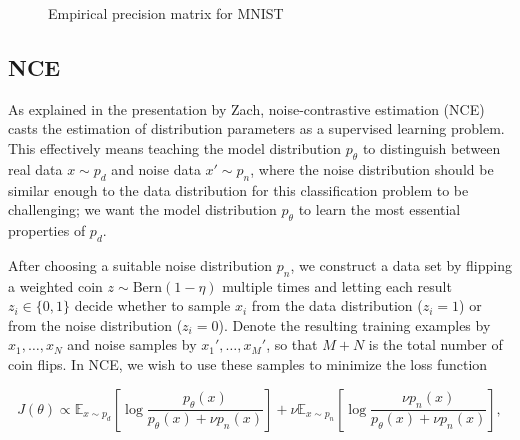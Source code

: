 \documentclass[a4paper]{article}
\theoremstyle{definition}
\theoremstyle{plain}
\begin{document}
\begin{figure}[H]
	\centering
	\begin{subfigure}[b]{0.49\textwidth}
		
		\caption{}
	\end{subfigure}
	\hfill
	\begin{subfigure}[b]{0.49\textwidth}
		
		\caption{}
	\end{subfigure}
	\caption{Empirical precision matrix for MNIST}
\end{figure}


\subsection*{NCE}

As explained in the presentation by Zach, noise-contrastive estimation (NCE) casts the estimation of distribution parameters as a supervised learning problem. This effectively means teaching the model distribution $p_\theta$ to distinguish between real data $x \sim p_d$ and noise data $x' \sim p_n$, where the noise distribution should be similar enough to the data distribution for this classification problem to be challenging; we want the model distribution $p_\theta$ to learn  the most essential properties of $p_d$.

After choosing a suitable noise distribution $p_n$, we construct a data set by flipping a weighted coin $z \sim \text{Bern}(1-\eta)$ multiple times and letting each result $z_i \in \{0,1\}$ decide whether to sample $x_i$ from the data distribution ($z_i = 1$) or from the noise distribution ($z_i = 0$). Denote the resulting training examples by $x_1,\ldots,x_N$ and noise samples by $x_1',\ldots,x_M'$, so that $M+N$ is the total number of coin flips. In NCE, we wish to use these samples to minimize the loss function

\begin{equation}\label{J_function}
J(\theta) \propto \mathbb{E}_{x \sim p_d} \left[ \log \frac{p_\theta(x)}{p_\theta(x) + \nu p_n(x)}\right] + \nu \mathbb{E}_{x \sim p_n} \left[ \log \frac{ \nu p_n(x)}{p_\theta(x) + \nu p_n(x)}\right],
\end{equation}
\end{document}
